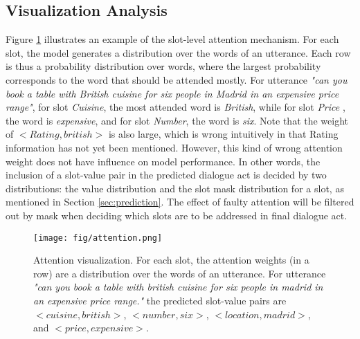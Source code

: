 \subsection{Visualization Analysis}
Figure \ref{fig:attention} illustrates an example of the slot-level attention mechanism. 
For each slot, the model generates a distribution over the words of an utterance. Each row is thus a probability distribution over words, where the largest probability corresponds to the word that should be attended mostly. 
For utterance {\em "can you book a table with British cuisine for six people in Madrid in an expensive price range"}, 
for slot {\em Cuisine}, the most attended word is {\em British}, while for slot {\em Price }, the word is {\em expensive}, and for slot {\em Number}, the word is {\em six}. 
Note that the weight of {\em $<Rating,british>$} is also large, which is wrong intuitively in that Rating information has not yet been mentioned. However, this kind of wrong attention weight does not have influence on model performance. 
In other words, the inclusion of a slot-value pair in the predicted dialogue act is decided by two distributions: the value distribution and the slot mask distribution for a slot, as mentioned in Section \ref{sec:prediction}. The effect of faulty attention will be filtered out by mask when deciding which slots are to be addressed in final dialogue act. %


\begin{figure}
\centering
\texttt{[image: fig/attention.png]}
\caption{Attention visualization. For each slot, the attention weights (in a row) are a distribution over the words of an utterance. For utterance {\em "can you book a table with british cuisine for six people in madrid in an expensive price range."} the predicted slot-value pairs are $<cuisine, british>$, $<number, six>$, $<location,madrid>$, and $<price, expensive>$. }
\label{fig:attention}
\end{figure}


